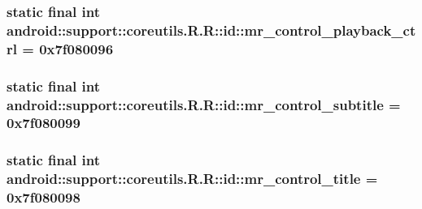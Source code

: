 \hypertarget{classandroid_1_1support_1_1coreutils_1_1_r_1_1id_9180eee04fc15f5281f40c31f52ed5c1}{
\subsubsection[{mr\_\-control\_\-playback\_\-ctrl}]{\setlength{\rightskip}{0pt plus 5cm}static final int android::support::coreutils.R.R::id::mr\_\-control\_\-playback\_\-ctrl = 0x7f080096}}
\label{classandroid_1_1support_1_1coreutils_1_1_r_1_1id_9180eee04fc15f5281f40c31f52ed5c1}


\hypertarget{classandroid_1_1support_1_1coreutils_1_1_r_1_1id_91ccf2ff920f0e6ee9d85fca0af4f0cd}{
\subsubsection[{mr\_\-control\_\-subtitle}]{\setlength{\rightskip}{0pt plus 5cm}static final int android::support::coreutils.R.R::id::mr\_\-control\_\-subtitle = 0x7f080099}}
\label{classandroid_1_1support_1_1coreutils_1_1_r_1_1id_91ccf2ff920f0e6ee9d85fca0af4f0cd}


\hypertarget{classandroid_1_1support_1_1coreutils_1_1_r_1_1id_960bdf5c2b588911ba093bad004a49fe}{
\subsubsection[{mr\_\-control\_\-title}]{\setlength{\rightskip}{0pt plus 5cm}static final int android::support::coreutils.R.R::id::mr\_\-control\_\-title = 0x7f080098}}
\label{classandroid_1_1support_1_1coreutils_1_1_r_1_1id_960bdf5c2b588911ba093bad004a49fe}



